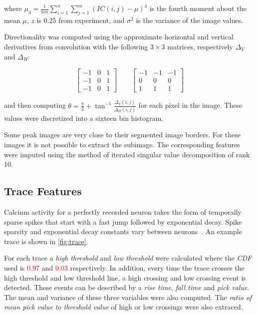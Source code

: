 \documentclass[10pt]{article}
\newcommand{\todo}[1]{\textcolor{red}{#1}}
\begin{document}
\noindent
where $\mu_4 = \frac{1}{nm} \sum_{i=1}^n \sum_{j=1}^m (IC(i,j)-\mu)^4$
is the fourth moment about the mean $\mu$, $z$ is \num{0.25} from experiment, and $\sigma^2$ is the variance of the image values.

Directionality was computed using the approximate horizontal and vertical derivatives from convolution with the following $3\times3$ matrices, respectively $\Delta_V$ and $\Delta_H$:

$$
\begin{bmatrix}
-1 & 0 & 1 \\ -1 & 0 & 1 \\ -1 & 0 & 1
\end{bmatrix} \qquad
\begin{bmatrix}
-1 & -1 & -1 \\
0 & 0 & 0 \\
1 & 1 & 1
\end{bmatrix}
$$

\noindent
and then computing $\theta = \frac{\pi}{2} + \tan^{-1}\frac{\Delta_V(i,j)}{\Delta_H(i,j)}$ for each pixel in the image.
These values were discretized into a sixteen bin histogram.

Some peak images are very close to their segmented image borders. For these images it is not possible to extract the subimage.
The corresponding features were imputed using the method of iterated singular value decomposition of rank \num{10}.

\subsection{Trace Features}

Calcium activity for a perfectly recorded neuron takes the form of temporally sparse spikes that start with a fast jump followed by exponential decay. Spike sparsity and exponential decay constants vary between neurons~\cite{Mukamel2009}. 
An example trace is shown in \cref{fig:trace}.

For each trace a \emph{high threshold} and \emph{low threshold} were calculated where the \emph{CDF} used is \todo{\num{0.97}} and \todo{\num{0.03}} respectively. In addition, every time the trace crosses the high threshold and low threshold line, a high crossing and low crossing event is detected. These events can be described by a \emph{rise time}, \emph{fall time} and \emph{pick value}. The mean and variance of these three variables were also computed. The \emph{ratio of mean pick value to threshold value} of high or low crossings were also extraced.
\end{document}

